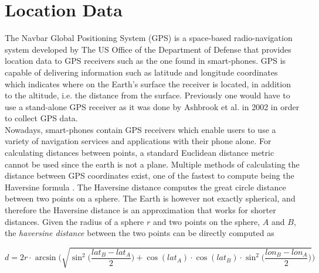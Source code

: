 \section{Location Data}
The Navbar Global Positioning System (GPS) is a space-based radio-navigation system developed by The US Office of the Department of Defense \cite{gps-navstar} that provides location data to GPS receivers such as the one found in smart-phones. GPS is capable of delivering information such as latitude and longitude coordinates which indicates where on the Earth's surface the receiver is located, in addition to the altitude, i.e. the distance from the surface. Previously one would have to use a stand-alone GPS receiver as it was done by Ashbrook et al.  in 2002 \cite{using_gps_to_learn_significant_locations} in order to collect GPS data.\\

Nowadays, smart-phones contain GPS receivers which enable users to use a variety of navigation services and applications with their phone alone. For calculating distances between points, a standard Euclidean distance metric cannot be used since the earth is not a plane. Multiple methods of calculating the distance between GPS coordinates exist, one of the fastest to compute being the Haversine formula \cite{haversine-formula}. The Haversine distance computes the great circle distance between two points on a sphere. The Earth is however not exactly spherical, and therefore the Haversine distance is an approximation that works for shorter distances. Given the radius of a sphere $r$ and two points on the sphere, $A$ and $B$, the \textit{haversine distance} between the two points can be directly computed as 

\begin{equation}
\label{eq:haversine}
d = 2r \cdot \arcsin \Bigg( \sqrt{\sin^2 \bigg( \frac{lat_B - lat_A}{2} \bigg) + \cos(lat_A) \cdot \cos(lat_B) \cdot \sin^2 \bigg(\frac{ lon_B - lon_A}{2} \bigg)}\Bigg)
\end{equation}

